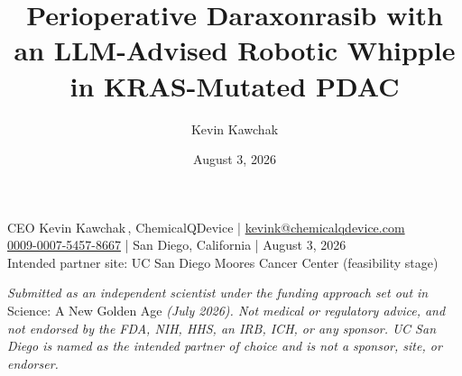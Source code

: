 \documentclass[11pt]{article}
\title{Perioperative Daraxonrasib with an LLM-Advised Robotic Whipple in
KRAS-Mutated PDAC}
\author{Kevin Kawchak}
\date{August 3, 2026}
\begin{document}
\thispagestyle{plain}


\vspace{0.05em}

\begin{center}
 \enspace
{} \enspace
{}
\end{center}

\vspace{-0.55em}

\begin{center}\small
CEO Kevin Kawchak\,, ChemicalQDevice \;|\;
\href{mailto:kevink@chemicalqdevice.com}{kevink@chemicalqdevice.com}\\
\href{https://orcid.org/0009-0007-5457-8667}{0009-0007-5457-8667} \;|\;
San Diego, California \;|\; August 3, 2026\\
Intended partner site: UC San Diego Moores Cancer Center (feasibility stage)
\end{center}

\vspace{-0.35em}
\apprule{0.8pt}

\noindent\footnotesize\textit{Submitted as an independent scientist under the
funding approach set out in} Science: A New Golden Age \textit{(July 2026). Not
medical or regulatory advice, and not endorsed by the FDA, NIH, HHS, an IRB,
ICH, or any sponsor. UC San Diego is named as the intended partner of choice and
is not a sponsor, site, or endorser.}\normalsize\par

\vspace{-0.1em}
\apprule{0.4pt}







\end{document}
